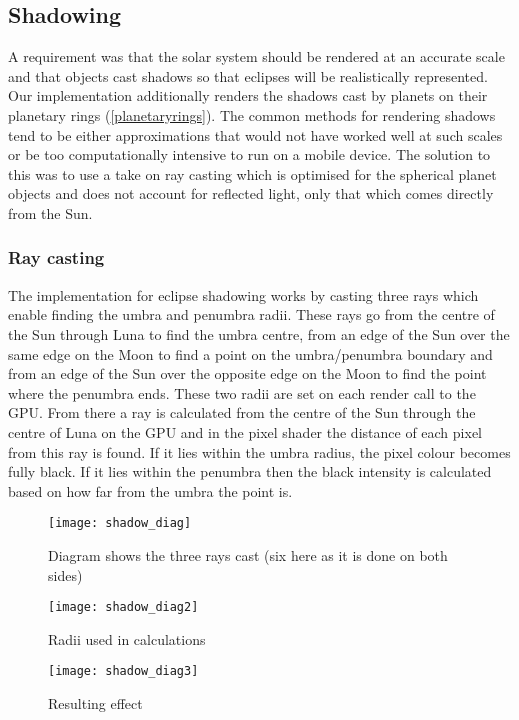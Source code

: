\pagebreak
\subsection{Shadowing}

A requirement was that the solar system should be rendered at an accurate scale
and that objects cast shadows so that eclipses will be realistically represented. Our implementation
additionally renders the shadows cast by planets on their planetary rings (\cref{planetaryrings}). The
common methods for rendering shadows tend to be either approximations that would
not have worked well at such scales or be too computationally intensive to run on a
mobile device. The solution to this was to use a take on ray casting which is optimised
for the spherical planet objects and does not account for reflected light, only that
which comes directly from the Sun.

\subsubsection{Ray casting}

The implementation for eclipse shadowing works by casting three rays which enable finding the umbra and penumbra radii. These rays go from the centre of the Sun through Luna to find the umbra centre, from an edge of the Sun over the same edge on the Moon to find a point on the umbra/penumbra boundary and from an edge of the Sun over the opposite edge on the Moon to find the point where the penumbra ends. These two radii are
set on each render call to the GPU. From there a ray is calculated from the centre of the Sun through the centre of Luna on the GPU and in the pixel shader the distance of each pixel from this ray is found. If it lies within the umbra radius, the pixel colour becomes fully black. If it lies within the penumbra then the black intensity is calculated based on how far from the umbra the point is.

\begin{figure}[!htbp]
\centering
  \centering
  \texttt{[image: shadow\_diag]}
  \caption{Diagram shows the three rays cast (six here as it is done on both sides)}
  \label{fig:shadowd1}
\end{figure}

\begin{figure}[!htbp]
\centering
\begin{minipage}{.5\textwidth}
  \centering
  \texttt{[image: shadow\_diag2]}
  \caption{Radii used in calculations}
  \label{fig:shadowd2}
\end{minipage}%
\begin{minipage}{.5\textwidth}
  \centering
  \texttt{[image: shadow\_diag3]}
  \caption{Resulting effect}
  \label{fig:shadowd3}
\end{minipage}
\end{figure}

